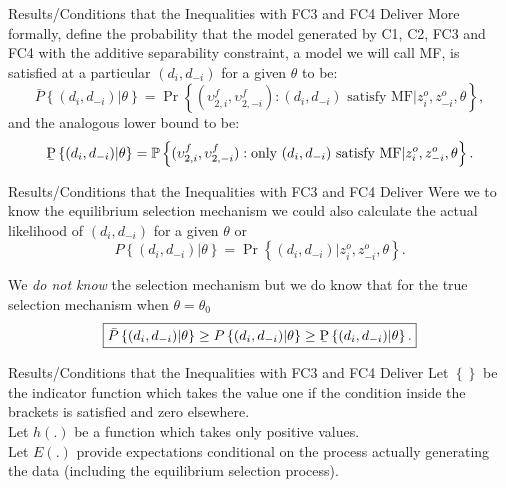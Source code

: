 \begin{frame}{\normalsize Results/Conditions that the Inequalities with FC3 and FC4 Deliver}
More formally, define the probability that the model generated by C1, C2,
FC3 and FC4 with the additive separability constraint, a model we will call
MF, is satisfied at a particular $(d_{i},d_{-i})$ for a given $\theta $ to
be: 
\begin{equation*}
\bar{P}\left\{ (d_{i},d_{-i})|\theta \right\} =\Pr \left\{ (\upsilon
_{2,i}^{f},\upsilon _{2,-i}^{f}):(d_{i},d_{-i})\text{ satisfy MF}%
|z_{i}^{o},z_{-i}^{o},\theta \right\} ,
\end{equation*}%
and the analogous lower bound to be:%
\begin{equation*}
\text{\b{P}}\left\{ (d_{i},d_{-i})|\theta \right\} =\Pr \left\{ (\upsilon
_{2,i}^{f},\upsilon _{2,-i}^{f}):\text{only }(d_{i},d_{-i})\text{ satisfy MF}%
|z_{i}^{o},z_{-i}^{o},\theta \right\} .
\end{equation*}
\end{frame}

\begin{frame}{\normalsize Results/Conditions that the Inequalities with FC3 and FC4 Deliver}
Were we to know the equilibrium selection mechanism we could also calculate
the actual likelihood of $(d_{i},d_{-i})$ for a given $\theta $ or%
\begin{equation*}
P\left\{ (d_{i},d_{-i})|\theta \right\} =\Pr \left\{
(d_{i},d_{-i})|z_{i}^{o},z_{-i}^{o},\theta \right\} .
\end{equation*}

We \textit{do not know} the selection mechanism but we do know that for the true
selection mechanism when $\theta =\theta _{0}$%
\begin{equation*}
\boxed{\bar{P}\left\{ (d_{i},d_{-i})|\theta \right\} \geq P\left\{
(d_{i},d_{-i})|\theta \right\} \geq \text{\b{P}}\left\{
(d_{i},d_{-i})|\theta \right\} .}
\end{equation*}
\end{frame}

\begin{frame}{\normalsize Results/Conditions that the Inequalities with FC3 and FC4 Deliver}
Let $\left\{ {}\right\}$ be the indicator function which takes the value
one if the condition inside the brackets is satisfied and zero elsewhere.\\
\vspace{0.2in}
Let $h(.)$ be a function which takes only positive values.\\
\vspace{0.2in}
Let $E(.)$ provide expectations conditional on the process actually generating the data
(including the equilibrium selection process).
\end{frame}

